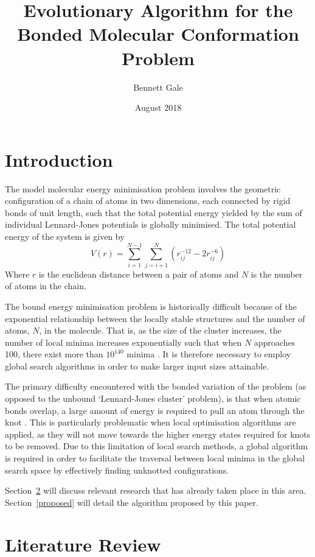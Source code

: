 \documentclass{article}
\title{Evolutionary Algorithm for the Bonded Molecular Conformation Problem}
\author{Bennett Gale}
\date{August 2018}
\begin{document}
\maketitle

\section{Introduction}

The model molecular energy minimisation problem involves the geometric
configuration of a chain of atoms in two dimensions, each connected by rigid
bonds of unit length, such that the total potential energy yielded by the sum of
individual Lennard-Jones potentials is globally minimised. The total potential
energy of the system is given by
$$V(r)=\sum^{N-1}_{i=1}\sum^{N}_{j=i+1}\left(r^{-12}_{ij}-2r^{-6}_{ij}\right)$$
Where $r$ is the euclidean distance between a pair of atoms and $N$ is the
number of atoms in the chain.

The bound energy minimisation problem is historically difficult because of the
exponential relationship between the locally stable structures and the number of
atoms, $N$, in the molecule. That is, as the size of the cluster increases, the
number of local minima increases exponentially such that when $N$ approaches
100, there exist more than $10^{140}$ minima \cite{DAVEN1996195}. It is
therefore necessary to employ global search algorithms in order to make
larger input sizes attainable.

The primary difficulty encountered with the bonded variation of the problem (as
opposed to the unbound `Lennard-Jones cluster' problem), is that when atomic
bonds overlap, a large amount of energy is required to pull an atom through the
knot \cite{doi:10.1002/qua.560440214}. This is particularly problematic when
local optimisation algorithms are applied, as they will not move towards the
higher energy states required for knots to be removed. Due to this limitation of
local search methods, a global algorithm is required in order to facilitate the
traversal between local minima in the global search space by effectively finding
unknotted configurations.

Section~\ref{litreview} will discuss relevant research that has already taken
place in this area. Section~\ref{proposed} will detail the algorithm proposed by
this paper.

\section{Literature Review} \label{litreview}
\end{document}
